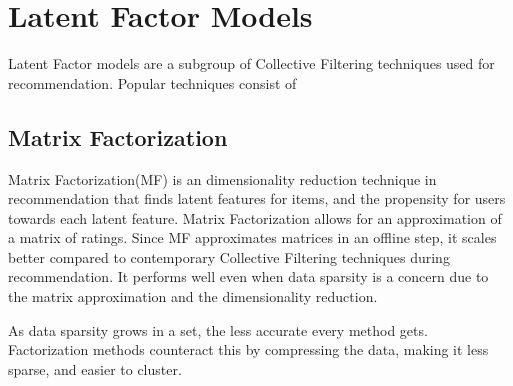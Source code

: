 \section{Latent Factor Models} \label{bg:matrixfactorization}
Latent Factor models are a subgroup of Collective Filtering techniques used for recommendation. Popular techniques consist of 

\subsection{Matrix Factorization}
Matrix Factorization(MF) is an dimensionality reduction technique in recommendation that finds latent features for items, and the propensity for users towards each latent feature.
Matrix Factorization allows for an approximation of a matrix of ratings.
Since MF approximates matrices in an offline step, it scales better compared to contemporary Collective Filtering techniques during recommendation. It performs well even when data sparsity is a concern due to the matrix approximation and the dimensionality reduction.

As data sparsity grows in a set, the less accurate every method gets. Factorization methods counteract this by compressing the data, making it less sparse, and easier to cluster.
